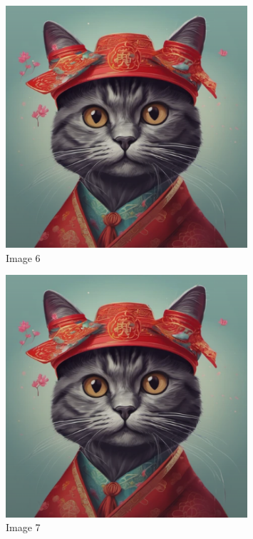 \documentclass{article}%
\begin{document}
\begin{figure}[h!]%
\centering%
\includegraphics[width=0.8\textwidth]{source/image1.png}%
\caption{Image 6}%
\end{figure}

%


\begin{figure}[h!]%
\centering%
\includegraphics[width=0.8\textwidth]{source/image1.png}%
\caption{Image 7}%
\end{figure}

%
\end{document}
